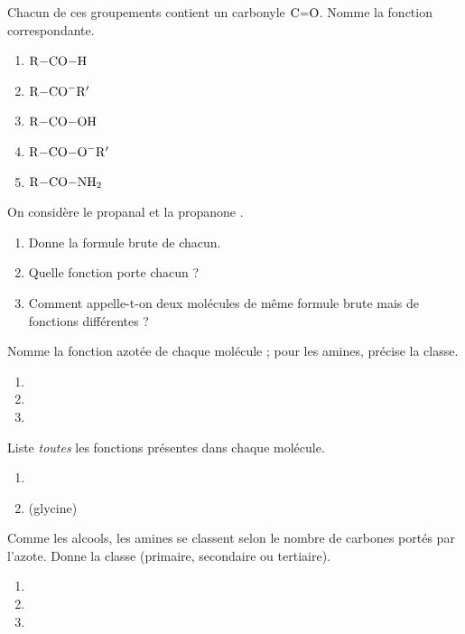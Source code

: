 \documentclass[11pt,a4paper]{article}
\begin{document}
\begin{exo}
Chacun de ces groupements contient un carbonyle $\ce{C=O}$. Nomme la fonction correspondante.
\begin{enumerate}[label=\alph*)]
  \item $\ce{R-CO-H}$
  \item $\ce{R-CO-}\mathrm{R}'$
  \item $\ce{R-CO-OH}$
  \item $\ce{R-CO-O-}\mathrm{R}'$
  \item $\ce{R-CO-NH2}$
\end{enumerate}
\end{exo}

\begin{exo}
On considère le propanal  et la propanone .
\begin{enumerate}[label=\alph*)]
  \item Donne la formule brute de chacun.
  \item Quelle fonction porte chacun ?
  \item Comment appelle-t-on deux molécules de même formule brute mais de fonctions différentes ?
\end{enumerate}
\end{exo}

\begin{exo}
Nomme la fonction azotée de chaque molécule ; pour les amines, précise la classe.
\begin{enumerate}[label=\alph*)]
  \item {}
  \item {}
  \item {}
\end{enumerate}
\end{exo}

\begin{exo}
Liste \emph{toutes} les fonctions présentes dans chaque molécule.
\begin{enumerate}[label=\alph*)]
  \item {}
  \item {} (glycine)
\end{enumerate}
\end{exo}

\begin{exo}
Comme les alcools, les amines se classent selon le nombre de carbones portés par l'azote. Donne la classe (primaire, secondaire ou tertiaire).
\begin{enumerate}[label=\alph*)]
  \item {}
  \item {}
  \item {}
\end{enumerate}
\end{exo}
\end{document}

